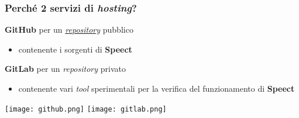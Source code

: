 \begin{frame}
\frametitle{Perché 2 servizi di \textit{hosting}?}
\begin{center}
\vspace{-2.24cm}
\end{center}
\vspace{1cm}
    \textbf{GitHub} per un \href{https://github.com/mivoq/speect}{\textit{repository}} pubblico
        \begin{itemize}
            \item contenente i sorgenti di \textbf{Speect}
        \end{itemize}
    \textbf{GitLab} per un \textit{repository} privato
        \begin{itemize}
            \item contenente vari \textit{tool} sperimentali
                  per la verifica del funzionamento di \textbf{Speect}
        \end{itemize}
\vspace{1cm}
\begin{center}
\texttt{[image: github.png]}
\hspace{0.7cm}
\hspace{0.75cm}
\hspace{0.75cm}
\texttt{[image: gitlab.png]}
\end{center}



\end{frame}
